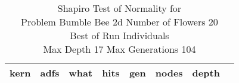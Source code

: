 \begin{table}[H]
\caption{Shapiro Test of Normality for \\ Problem  Bumble Bee 2d  Number of Flowers 20\\Best of Run Individuals \\ Max Depth 17 Max Generations 104\\}
\begin{center}
\scalebox{0.8} %
{
\begin{tabular}{lrrrrrrr}
\hline
kern & adfs & what & hits & gen & nodes & depth \\
\hline


\end{tabular}
}
\end{center}
\end{table}

